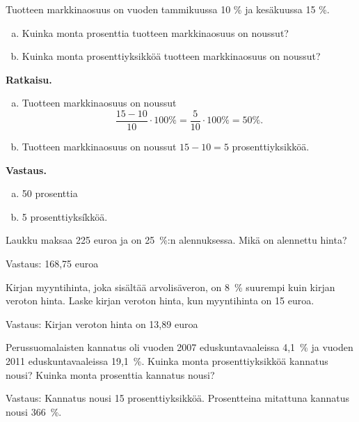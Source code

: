 \begin{esimerkki}
    Tuotteen markkinaosuus on vuoden tammikuussa 10 \% ja kesäkuussa 15 \%. 
    \begin{enumerate}[a)]
    \item Kuinka monta prosenttia tuotteen markkinaosuus on noussut?
    
    \item Kuinka monta prosenttiyksikköä tuotteen markkinaosuus on noussut?
    \end{enumerate}
    
    {\bf Ratkaisu.} 
    
    \begin{enumerate}[a)]
    \item Tuotteen markkinaosuus on noussut
    \[
    \frac{15-10}{10} \cdot 100 \%= \frac{5}{10}\cdot 100\% = 50\%.
    \]
    
    \item Tuotteen markkinaosuus on noussut $15-10=5$ prosenttiyksikköä. 
    \end{enumerate}
    
    {\bf Vastaus.}
    
    \begin{enumerate}[a)]
    \item 50 prosenttia
    \item 5 prosenttiyksíkköä.
    \end{enumerate}
\end{esimerkki}


\begin{tehtava}
    Laukku maksaa 225 euroa ja on 25~\%:n alennuksessa. Mikä on alennettu hinta?
    \begin{vastaus}
    Vastaus: 168,75 euroa
    \end{vastaus}
\end{tehtava}

\begin{tehtava}
    Kirjan myyntihinta, joka sisältää arvolisäveron, on 8~\% suurempi kuin kirjan veroton hinta. Laske kirjan veroton hinta, kun myyntihinta on 15 euroa.
    \begin{vastaus}
        Vastaus: Kirjan veroton hinta on 13,89 euroa
    \end{vastaus}
\end{tehtava}

\begin{tehtava}
    Perussuomalaisten kannatus oli vuoden 2007 eduskuntavaaleissa 4,1~\% ja vuoden 2011 eduskuntavaaleissa 19,1~\%. Kuinka monta prosenttiyksikköä kannatus nousi? Kuinka monta prosenttia kannatus nousi?
    \begin{vastaus}
    Vastaus: Kannatus nousi 15 prosenttiyksikköä. Prosentteina mitattuna kannatus nousi 366~\%.
    \end{vastaus}
\end{tehtava}

